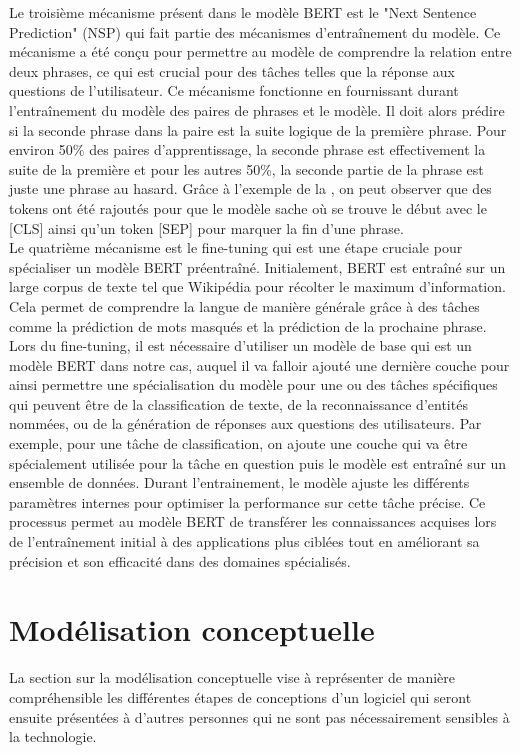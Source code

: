 \documentclass{rapport}
\begin{document}
\newpage
Le troisième mécanisme présent dans le modèle BERT est le "Next Sentence Prediction" (NSP) qui fait partie des mécanismes d'entraînement du modèle. Ce mécanisme a été conçu pour permettre au modèle de comprendre la relation entre deux phrases, ce qui est crucial pour des tâches telles que la réponse aux questions de l'utilisateur. Ce mécanisme fonctionne en fournissant durant l'entraînement du modèle des paires de phrases et le modèle. Il doit alors prédire si la seconde phrase dans la paire est la suite logique de la première phrase. Pour environ 50\% des paires d'apprentissage, la seconde phrase est effectivement la suite de la première et pour les autres 50\%, la seconde partie de la phrase est juste une phrase au hasard. Grâce à l'exemple de la , on peut observer que des tokens ont été rajoutés pour que le modèle sache où se trouve le début avec le [CLS] ainsi qu'un token [SEP] pour marquer la fin d'une phrase.
\\

Le quatrième mécanisme est le fine-tuning qui est une étape cruciale pour spécialiser un modèle BERT préentraîné. Initialement, BERT est entraîné sur un large corpus de texte tel que Wikipédia pour récolter le maximum d'information. Cela permet de comprendre la langue de manière générale grâce à des tâches comme la prédiction de mots masqués et la prédiction de la prochaine phrase. Lors du fine-tuning, il est nécessaire d'utiliser un modèle de base qui est un modèle BERT dans notre cas, auquel il va falloir ajouté une dernière couche pour ainsi permettre une spécialisation du modèle pour une ou des tâches spécifiques qui peuvent être de la classification de texte, de la reconnaissance d'entités nommées, ou de la génération de réponses aux questions des utilisateurs. Par exemple, pour une tâche de classification, on ajoute une couche qui va être spécialement utilisée pour la tâche en question puis le modèle est entraîné sur un ensemble de données. Durant l'entrainement, le modèle ajuste les différents paramètres internes pour optimiser la performance sur cette tâche précise. Ce processus permet au modèle BERT de transférer les connaissances acquises lors de l'entraînement initial à des applications plus ciblées tout en améliorant sa précision et son efficacité dans des domaines spécialisés.
\newpage
\section{Modélisation conceptuelle}
\label{sec:concept}
La section sur la modélisation conceptuelle vise à représenter de manière compréhensible les différentes étapes de conceptions d'un logiciel qui seront ensuite présentées à d'autres personnes qui ne sont pas nécessairement sensibles à la technologie. 
\end{document}
